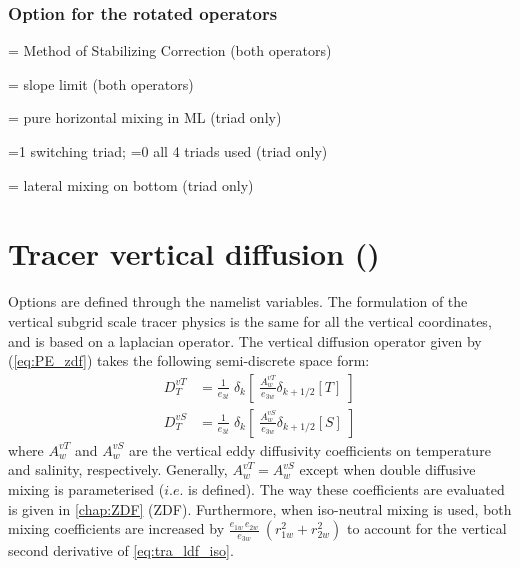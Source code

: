 \documentclass[../tex_main/NEMO_manual]{subfiles}
\begin{document}
\subsubsection{Option for the rotated operators}
\label{subsec:TRA_ldf_options}

 = Method of Stabilizing Correction (both operators)

 = slope limit (both operators)

 = pure horizontal mixing in ML (triad only)

 =1 switching triad;
                   =0 all 4 triads used (triad only) 

 = lateral mixing on bottom (triad only)

\section{Tracer vertical diffusion (\protect{})}
\label{sec:TRA_zdf}


Options are defined through the  namelist variables.
The formulation of the vertical subgrid scale tracer physics is the same for all the vertical coordinates,
and is based on a laplacian operator.
The vertical diffusion operator given by (\autoref{eq:PE_zdf}) takes the following semi-discrete space form:
\begin{equation} \label{eq:tra_zdf}
\begin{split}
D^{vT}_T &= \frac{1}{e_{3t}} \; \delta_k \left[ \;\frac{A^{vT}_w}{e_{3w}}  \delta_{k+1/2}[T] \;\right] 
\\
D^{vS}_T &= \frac{1}{e_{3t}} \; \delta_k \left[ \;\frac{A^{vS}_w}{e_{3w}}  \delta_{k+1/2}[S] \;\right] 
\end{split}
\end{equation}
where $A_w^{vT}$ and $A_w^{vS}$ are the vertical eddy diffusivity coefficients on temperature and salinity,
respectively.
Generally, $A_w^{vT}=A_w^{vS}$ except when double diffusive mixing is parameterised ($i.e.$  is defined).
The way these coefficients are evaluated is given in \autoref{chap:ZDF} (ZDF).
Furthermore, when iso-neutral mixing is used, both mixing coefficients are increased by
$\frac{e_{1w}\,e_{2w} }{e_{3w} }\ \left( {r_{1w} ^2+r_{2w} ^2} \right)$ to account for
the vertical second derivative of \autoref{eq:tra_ldf_iso}.
\end{document}
